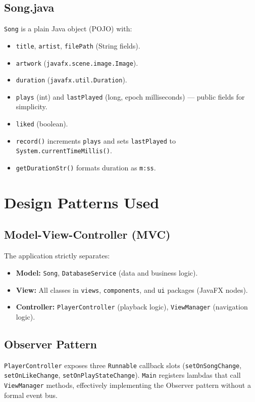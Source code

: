 ﻿\documentclass[12pt]{report}
\begin{document}
\subsection{Song.java}
\texttt{Song} is a plain Java object (POJO) with:
\begin{itemize}
    \item \texttt{title}, \texttt{artist}, \texttt{filePath} (String fields).
    \item \texttt{artwork} (\texttt{javafx.scene.image.Image}).
    \item \texttt{duration} (\texttt{javafx.util.Duration}).
    \item \texttt{plays} (int) and \texttt{lastPlayed} (long, epoch milliseconds) --- public fields for simplicity.
    \item \texttt{liked} (boolean).
    \item \texttt{record()} increments \texttt{plays} and sets \texttt{lastPlayed} to \texttt{System.currentTimeMillis()}.
    \item \texttt{getDurationStr()} formats duration as \texttt{m:ss}.
\end{itemize}

\section{Design Patterns Used}

\subsection{Model-View-Controller (MVC)}
The application strictly separates:
\begin{itemize}
    \item \textbf{Model:} \texttt{Song}, \texttt{DatabaseService} (data and business logic).
    \item \textbf{View:} All classes in \texttt{views}, \texttt{components}, and \texttt{ui} packages (JavaFX nodes).
    \item \textbf{Controller:} \texttt{PlayerController} (playback logic), \texttt{ViewManager} (navigation logic).
\end{itemize}

\subsection{Observer Pattern}
\texttt{PlayerController} exposes three \texttt{Runnable} callback slots (\texttt{setOnSongChange}, \texttt{setOnLikeChange}, \texttt{setOnPlayStateChange}). \texttt{Main} registers lambdas that call \texttt{ViewManager} methods, effectively implementing the Observer pattern without a formal event bus.
\end{document}
